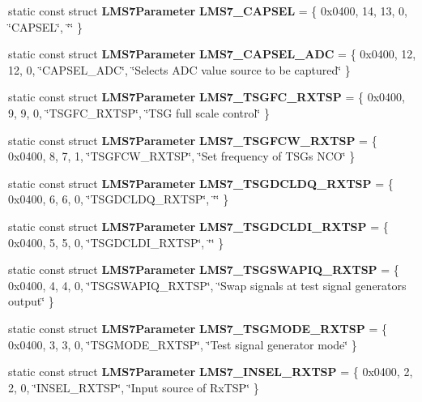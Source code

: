 \begin{DoxyCompactItemize}
\item 
static const struct {\bf L\+M\+S7\+Parameter} {\bf L\+M\+S7\+\_\+\+C\+A\+P\+S\+EL} = \{ 0x0400, 14, 13, 0, \char`\"{}\+C\+A\+P\+S\+E\+L\char`\"{}, \char`\"{}\char`\"{} \}
\item 
static const struct {\bf L\+M\+S7\+Parameter} {\bf L\+M\+S7\+\_\+\+C\+A\+P\+S\+E\+L\+\_\+\+A\+DC} = \{ 0x0400, 12, 12, 0, \char`\"{}\+C\+A\+P\+S\+E\+L\+\_\+\+A\+D\+C\char`\"{}, \char`\"{}\+Selects A\+D\+C value source to be captured\char`\"{} \}
\item 
static const struct {\bf L\+M\+S7\+Parameter} {\bf L\+M\+S7\+\_\+\+T\+S\+G\+F\+C\+\_\+\+R\+X\+T\+SP} = \{ 0x0400, 9, 9, 0, \char`\"{}\+T\+S\+G\+F\+C\+\_\+\+R\+X\+T\+S\+P\char`\"{}, \char`\"{}\+T\+S\+G full scale control\char`\"{} \}
\item 
static const struct {\bf L\+M\+S7\+Parameter} {\bf L\+M\+S7\+\_\+\+T\+S\+G\+F\+C\+W\+\_\+\+R\+X\+T\+SP} = \{ 0x0400, 8, 7, 1, \char`\"{}\+T\+S\+G\+F\+C\+W\+\_\+\+R\+X\+T\+S\+P\char`\"{}, \char`\"{}\+Set frequency of T\+S\+G\textquotesingle{}s N\+C\+O\char`\"{} \}
\item 
static const struct {\bf L\+M\+S7\+Parameter} {\bf L\+M\+S7\+\_\+\+T\+S\+G\+D\+C\+L\+D\+Q\+\_\+\+R\+X\+T\+SP} = \{ 0x0400, 6, 6, 0, \char`\"{}\+T\+S\+G\+D\+C\+L\+D\+Q\+\_\+\+R\+X\+T\+S\+P\char`\"{}, \char`\"{}\char`\"{} \}
\item 
static const struct {\bf L\+M\+S7\+Parameter} {\bf L\+M\+S7\+\_\+\+T\+S\+G\+D\+C\+L\+D\+I\+\_\+\+R\+X\+T\+SP} = \{ 0x0400, 5, 5, 0, \char`\"{}\+T\+S\+G\+D\+C\+L\+D\+I\+\_\+\+R\+X\+T\+S\+P\char`\"{}, \char`\"{}\char`\"{} \}
\item 
static const struct {\bf L\+M\+S7\+Parameter} {\bf L\+M\+S7\+\_\+\+T\+S\+G\+S\+W\+A\+P\+I\+Q\+\_\+\+R\+X\+T\+SP} = \{ 0x0400, 4, 4, 0, \char`\"{}\+T\+S\+G\+S\+W\+A\+P\+I\+Q\+\_\+\+R\+X\+T\+S\+P\char`\"{}, \char`\"{}\+Swap signals at test signal generator\textquotesingle{}s output\char`\"{} \}
\item 
static const struct {\bf L\+M\+S7\+Parameter} {\bf L\+M\+S7\+\_\+\+T\+S\+G\+M\+O\+D\+E\+\_\+\+R\+X\+T\+SP} = \{ 0x0400, 3, 3, 0, \char`\"{}\+T\+S\+G\+M\+O\+D\+E\+\_\+\+R\+X\+T\+S\+P\char`\"{}, \char`\"{}\+Test signal generator mode\char`\"{} \}
\item 
static const struct {\bf L\+M\+S7\+Parameter} {\bf L\+M\+S7\+\_\+\+I\+N\+S\+E\+L\+\_\+\+R\+X\+T\+SP} = \{ 0x0400, 2, 2, 0, \char`\"{}\+I\+N\+S\+E\+L\+\_\+\+R\+X\+T\+S\+P\char`\"{}, \char`\"{}\+Input source of Rx\+T\+S\+P\char`\"{} \}
\item 

\end{DoxyCompactItemize}
